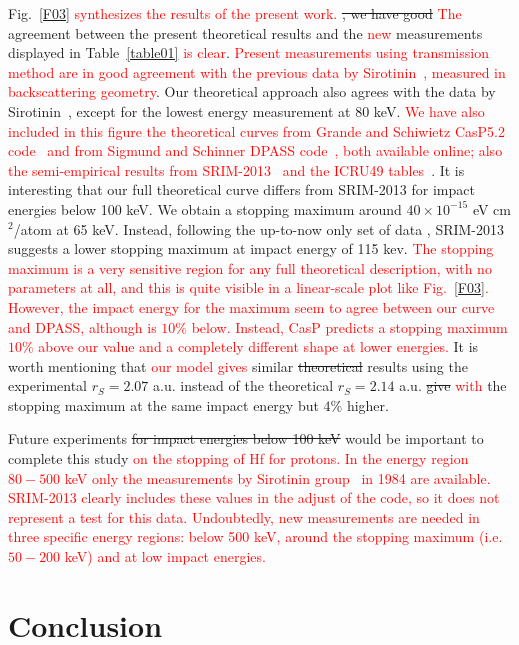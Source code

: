 \documentclass[aps,pra,reprint,superscriptaddress]{revtex4-1}
\def\clau#1{\textcolor{red}{#1}}
\begin{document}
Fig.~\ref{F03} \clau{synthesizes the results of the present work.} \st{, we have good} \clau{The} agreement between the present 
theoretical results and the \clau{new} measurements displayed in Table~\ref{table01} \clau{is clear}. \clau{Present measurements using transmission method are in good agreement with the previous data by 
Sirotinin~\cite{Sirotinin}, measured in backscattering geometry}. Our theoretical approach also agrees with the data by 
Sirotinin~\cite{Sirotinin}, except for the lowest energy measurement at 
80 keV. \clau{We have also included in this figure the theoretical curves from Grande and Schiwietz CasP5.2 code~\cite{Grande,casp52} and from Sigmund and Schinner DPASS code~\cite{DPASS20}, both available online; also the semi-empirical results from SRIM-2013~\cite{Ziegler01} and the ICRU49 tables~\cite{ICRU49}}. It is interesting that our full theoretical curve differs from 
SRIM-2013 for impact energies below 100 keV. We obtain a stopping 
maximum around $40 \times 10^{-15}$ eV cm$^2$/atom  at 65 keV. Instead,
following the up-to-now only set of data \cite{Sirotinin}, SRIM-2013
suggests a lower stopping maximum  at impact energy of 115 kev. 
\clau{The stopping maximum is a very sensitive region for any full theoretical description, with no parameters at all, and this is quite visible in a linear-scale plot like Fig.~\ref{F03}. However, the impact energy for the maximum seem to agree between our curve and DPASS, although is $10 \%$ below. Instead, CasP predicts a stopping maximum $10 \%$ above our value and a completely different shape at lower energies.}
It is 
worth mentioning that \clau{our model gives} similar \st{theoretical} results using the experimental 
$r_S=2.07$ a.u. instead of the theoretical $r_S=2.14$ a.u. \st{give} \clau{with} the 
stopping maximum at the same impact energy but $4\%$ higher. 

Future experiments \st{for impact energies below 100 keV} would be important to
complete this study \clau{on the stopping of Hf for protons. In the energy region $80-500$ keV only the measurements by Sirotinin group~\cite{Sirotinin} in 1984 are available. SRIM-2013 clearly includes these values in the adjust of the code, so it does not represent a test for this data. Undoubtedly, new measurements are needed in three specific energy regions: below 500 keV, around the stopping maximum (i.e. $50-200$ keV) and at low impact energies. } 

\section{Conclusion}
\label{conclusion}
\end{document}
